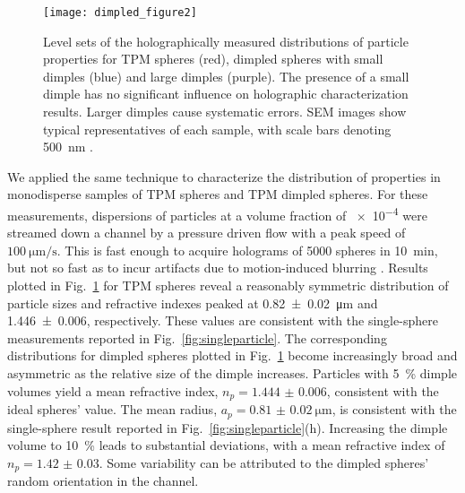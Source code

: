 \begin{figure}[!t]
  \centering
  \texttt{[image: dimpled\_figure2]}
  \caption{Level sets of the holographically measured 
    distributions of particle properties for TPM spheres
    (red), dimpled spheres with small dimples (blue) and
    large dimples (purple).  The presence of a small dimple
    has no significant influence on holographic characterization
    results.  Larger dimples cause systematic errors.
    SEM images show typical representatives of each sample,
    with scale bars denoting \SI{500}{\nm} \cite{hannel15}.}
  \label{fig:distributions}
\end{figure}

We applied the same technique to characterize the distribution
of properties in monodisperse samples of TPM spheres and 
TPM dimpled spheres.
For these measurements, dispersions of particles at a volume fraction
of \num{e-4} were streamed down a channel by a pressure driven flow
with a peak speed of $\SI{100}{\um\per\second}$.  This is fast enough
to acquire holograms of \num{5000} spheres in \SI{10}{\minute}, but
not so fast as to incur artifacts due to motion-induced blurring
\cite{cheong09,dixon11}.
Results plotted in Fig.~\ref{fig:distributions} for TPM spheres reveal
a reasonably symmetric distribution of particle sizes and refractive
indexes peaked at \SI{0.82(2)}{\um} and \num{1.446(6)}, respectively.
These values are consistent with the single-sphere measurements
reported in Fig.~\ref{fig:singleparticle}.
The corresponding distributions for dimpled spheres plotted in
Fig.~\ref{fig:distributions} become increasingly broad and asymmetric
as the relative size of the dimple increases.
Particles with \SI{5}{\percent} dimple volumes yield a mean refractive
index, $n_p=\num{1.444(6)}$, consistent with the ideal spheres' value.
The mean radius, $a_p=\SI{0.81(2)}{\um}$, is consistent with the
  single-sphere result reported in Fig.~\ref{fig:singleparticle}(h).
Increasing the dimple volume to \SI{10}{\percent} leads to
substantial deviations, with a mean refractive index of
$n_p=\num{1.42(3)}$.
Some variability can be attributed to the dimpled spheres'
random orientation in the channel.

